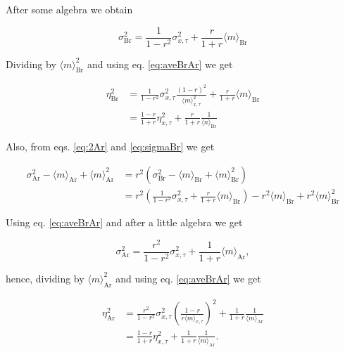 After some algebra we obtain

\begin{equation}
  \label{eq:sigmaBr}
  \sigma^2_\text{Br} = \frac{1}{1-r^2}\sigma^2_{x,\tau}+\frac{r}{1+r}\langle m\rangle_\text{Br}
\end{equation}

Dividing by $\langle m\rangle_\text{Br}^2$ and using eq. \ref{eq:aveBrAr} we get

\begin{equation}
  \begin{split}
    \eta_\text{Br}^2 &= \frac{1}{1-r^2}\sigma_{x,\tau}^2\frac{(1-r)^2}{\langle m\rangle_{x,\tau}^2} + \frac{r}{1+r}\langle m\rangle_\text{Br}\\
    & = \frac{1-r}{1+r}\eta_{x,\tau}^2+\frac{r}{1+r}\frac{1}{\langle n\rangle_\text{Br}}
  \end{split}
\end{equation}

Also, from eqs. \ref{eq:2Ar} and \ref{eq:sigmaBr} we get

\begin{equation}
  \begin{split}
    \sigma^2_\text{Ar} - \langle m\rangle_\text{Ar} + \langle m\rangle_\text{Ar}^2 &= r^2\left(\sigma^2_\text{Br}- \langle m\rangle_\text{Br} + \langle m\rangle^2_\text{Br}\right)\\
  &=r^2\left(\frac{1}{1-r^2}\sigma^2_{x,\tau}+\frac{r}{1+r}\langle m\rangle_\text{Br}\right)-r^2\langle m\rangle_\text{Br} + r^2\langle m\rangle^2_\text{Br}
  \end{split}
\end{equation}

Using eq. \ref{eq:aveBrAr} and after a little algebra we get


\begin{equation}
  \sigma^2_\text{Ar} = \frac{r^2}{1-r^2}\sigma^2_{x,\tau}+\frac{1}{1+r}\langle m\rangle_\text{Ar},
\end{equation}

hence, dividing by $\langle m\rangle_\text{Ar}^2$ and using eq. \ref{eq:aveBrAr} we get

\begin{equation}
  \begin{split}
    \eta^2_\text{Ar} &= \frac{r^2}{1-r^2}\sigma^2_{x,\tau}\left(\frac{1-r}{r\langle m\rangle_{x,\tau}}\right)^2+\frac{1}{1+r}\frac{1}{\langle m\rangle_\text{Ar}}\\
    &=\frac{1-r}{1+r}\eta^2_{x,\tau}+\frac{1}{1+r}\frac{1}{\langle m\rangle_\text{Ar}}.
  \end{split}
\end{equation}

